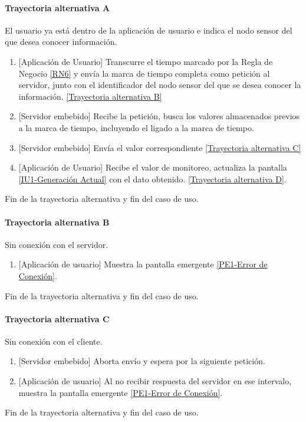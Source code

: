 \paragraph{Trayectoria alternativa A} \label{SUB-U-CU1.2:TA}
	El usuario ya está dentro de la aplicación de usuario e indica el nodo sensor del que desea conocer información.
	\begin{enumerate}[label=A\arabic*.]
		\item {[Aplicación de Usuario]} Transcurre el tiempo marcado por la Regla de Negocio \ref{RN6} y envía la marca de tiempo completa como petición al servidor, junto con el identificador del nodo sensor del que se desea conocer la información. \hyperref[SUB-U-CU1.2:TB]{[Trayectoria alternativa B]} 
		\item {[Servidor embebido]} Recibe la petición, busca los valores almacenados previos a la marca de tiempo, incluyendo el ligado a la marca de tiempo.
		\item  {[Servidor embebido]} Envía el valor correspondiente \hyperref[SUB-U-CU1.2:TC]{[Trayectoria alternativa C]}
        \item {[Aplicación de Usuario]} Recibe el valor de monitoreo, actualiza la pantalla \hyperref[fig:monitoreo]{[IU1-Generación Actual]} con el dato obtenido.
        \hyperref[SUB-U-CU1.2:TD]{[Trayectoria alternativa D]}.
	\end{enumerate}
	Fin de la trayectoria alternativa y fin del caso de uso.

\paragraph{Trayectoria alternativa B} \label{SUB-U-CU1.2:TB}
	Sin conexión con el servidor.
	\begin{enumerate}[label=B\arabic*.]
		\item {[Aplicación de usuario]} Muestra la pantalla emergente \hyperref[fig:Error de Conexion]{[PE1-Error de Conexión]}.
	\end{enumerate}
	Fin de la trayectoria alternativa y fin del caso de uso.


\paragraph{Trayectoria alternativa C} \label{SUB-U-CU1.2:TC}
	Sin conexión con el cliente.
	\begin{enumerate}[label=C\arabic*.]
		\item {[Servidor embebido]} Aborta envío y espera por la siguiente petición.
		\item {[Aplicación de usuario]} Al no recibir respuesta del servidor en ese intervalo, muestra la pantalla emergente \hyperref[fig:Error de Conexion]{[PE1-Error de Conexión]}.
	\end{enumerate}
	Fin de la trayectoria alternativa y fin del caso de uso.
	
